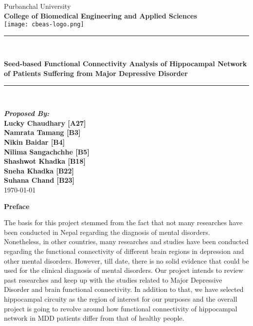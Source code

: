 \documentclass[12pt]{article}
\begin{document}
\begin{titlepage}

\newcommand{\HRule}{\rule{\linewidth}{0.1mm}}

\begin{center}

  {\huge Purbanchal University}\\[1cm]

  \textbf{\huge College of Biomedical Engineering and Applied Sciences}\\[1cm]


  \texttt{[image: cbeas-logo.png]}\\[1cm]

  \color{red} \HRule \\[0.4cm] \color{black}

  {\huge \bfseries Seed-based Functional Connectivity Analysis of
  Hippocampal Network of Patients Suffering from \linebreak Major
  Depressive Disorder}\\[0.2cm]

  \color{red} \HRule \\[2cm] \color{black}

  \textbf{\Large \textit{ Proposed By: } \\[5mm]
  \Large
  Lucky Chaudhary [A27] \\
  Namrata Tamang [B3] \\
  Nikin Baidar [B4] \\
  Nilima Sangachchhe [B5] \\
  Shashwot Khadka [B18] \\
  Sneha Khadka [B22] \\ [1mm]
  Suhana Chand [B23]} \\ [1cm]

  \vfill
  {\Large \today}

\end{center}

\end{titlepage}

\clearpage
\setcounter{page}{1}
\hskip180pt {\textbf{\centering \large Preface} }
\vskip2pt

The basis for this project stemmed from the fact that not many
researches have been conducted in Nepal regarding the diagnosis of
mental disorders. Nonetheless, in other countries, many researches and
studies have been conducted regarding the functional connectivity of
different brain regions in depression and other mental
disorders. However, till date, there is no solid evidence that could
be used for the clinical diagnosis of mental disorders. Our project
intends to review past researches and keep up with the studies related
to Major Depressive Disorder and brain functional connectivity. In
addition to that, we have selected hippocampal circuity as the region
of interest for our purposes and the overall project is going to
revolve around how functional connectivity of hippocampal network in
MDD patients differ from that of healthy people.
\end{document}

